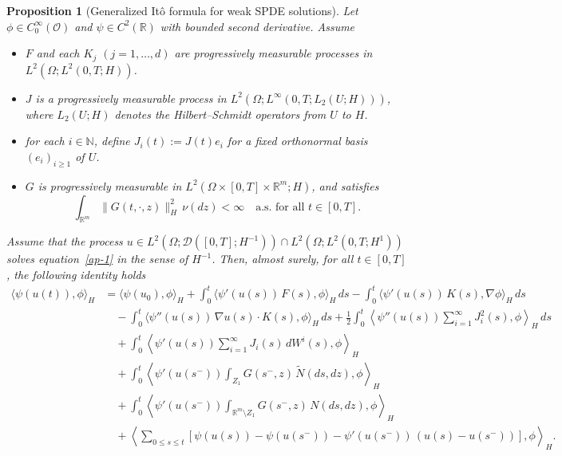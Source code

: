 \documentclass[11pt]{article}
\theoremstyle{plain}
\newtheorem{proposition}[theorem]{Proposition}
\numberwithin{equation}{section}
\begin{document}
 \begin{proposition}[Generalized It\^o formula for weak SPDE solutions]\label{prop:ito-formula}
Let $\phi \in C^\infty_0(\mathcal{O})$ and $\psi \in C^2(\mathbb{R})$ with bounded second derivative.
Assume
\begin{itemize}
    \item $F$ and each $K_j$ $(j=1,\dots,d)$ are progressively measurable processes in $L^2(\Omega; L^2(0,T; H))$.
    \item $J$ is a progressively measurable process in $L^2(\Omega; L^\infty(0,T; L_2(U;H)))$, where $L_2(U;H)$ denotes the Hilbert–Schmidt operators from $U$ to $H$.
    \item for each $i \in \mathbb{N}$, define $J_i(t) := J(t)e_i$ for a fixed orthonormal basis $(e_i)_{i\geq1}$ of $U$.
    \item $G$ is progressively measurable in $L^2(\Omega \times [0,T] \times \mathbb{R}^m; H)$, and satisfies
    \[
    \int_{\mathbb{R}^m} \|G(t,\cdot,z)\|_H^2\,\nu(dz) < \infty \quad \text{a.s. for all } t\in[0,T].
    \]
\end{itemize}

Assume that the process $u \in L^2(\Omega; \mathcal{D}([0,T]; H^{-1})) \cap L^2(\Omega; L^2(0,T; H^1))$ solves equation~\eqref{ap-1} in the sense of $H^{-1}$. Then, almost surely, for all $t \in [0,T]$, the following identity holds
\begin{align}\label{ap-2}
\langle \psi(u(t)), \phi \rangle_H
&= \langle \psi(u_0), \phi \rangle_H
+ \int_0^t \langle \psi'(u(s))\,F(s), \phi \rangle_H\,ds
- \int_0^t \langle \psi'(u(s))\,K(s), \nabla \phi \rangle_H\,ds \nonumber\\
&\quad - \int_0^t \langle \psi''(u(s))\,\nabla u(s) \cdot K(s), \phi \rangle_H\,ds
+ \frac{1}{2} \int_0^t \left\langle \psi''(u(s)) \sum_{i=1}^\infty J_i^2(s), \phi \right\rangle_H\,ds \nonumber\\
&\quad + \int_0^t \left\langle \psi'(u(s)) \sum_{i=1}^\infty J_i(s)\,dW^i(s), \phi \right\rangle_H \nonumber\\
&\quad + \int_0^t \left\langle \psi'(u(s^-)) \int_{Z_1} G(s^-,z)\,\tilde{N}(ds,dz), \phi \right\rangle_H \nonumber\\
&\quad + \int_0^t \left\langle \psi'(u(s^-)) \int_{\mathbb{R}^m \setminus Z_1} G(s^-,z)\,N(ds,dz), \phi \right\rangle_H \nonumber\\
&\quad + \left\langle \sum_{0 \le s \le t} \left[ \psi(u(s)) - \psi(u(s^-)) - \psi'(u(s^-))\,(u(s) - u(s^-)) \right], \phi \right\rangle_H.
\end{align}
\end{proposition}
\end{document}
